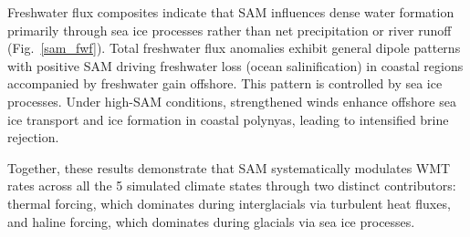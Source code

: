 \documentclass[draft]{agujournal2025}
\begin{document}
Freshwater flux composites indicate that SAM influences dense water formation primarily through sea ice processes rather than net precipitation or river runoff (Fig.~\ref{sam_fwf}). Total freshwater flux anomalies exhibit general dipole patterns with positive SAM driving freshwater loss (ocean salinification) in coastal regions accompanied by freshwater gain offshore. This pattern is controlled by sea ice processes. Under high-SAM conditions, strengthened winds enhance offshore sea ice transport and ice formation in coastal polynyas, leading to intensified brine rejection.

Together, these results demonstrate that SAM systematically modulates WMT rates across all the 5 simulated climate states through two distinct contributors: thermal forcing, which dominates during interglacials via turbulent heat fluxes, and haline forcing, which dominates during glacials via sea ice processes.






\end{document}
